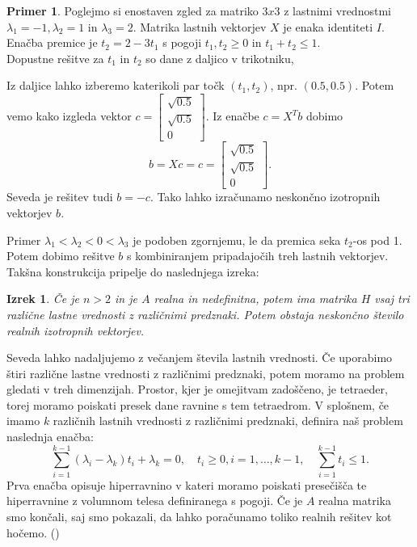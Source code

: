 \documentclass[12pt,a4paper]{amsart}
\theoremstyle{definition}
\newtheorem{primer}[definicija]{Primer}
\theoremstyle{plain}
\newtheorem{izrek}[definicija]{Izrek}
\begin{document}
\begin{primer}
Poglejmo si enostaven zgled za matriko $3x3$ z lastnimi vrednostmi $\lambda_1=-1, \lambda_2=1$ in $\lambda_3=2$.
Matrika lastnih vektorjev $X$ je enaka identiteti $I$.\\
Enačba premice je $t_2=2-3t_1$ s pogoji $t_1, t_2 \ge 0$ in $t_1+t_2\le 1$.\\
Dopustne rešitve za $t_1$ in $t_2$ so dane z daljico v trikotniku, %

Iz daljice lahko izberemo katerikoli par točk $(t_1, t_2)$, npr. $(0.5, 0.5)$. Potem vemo kako izgleda vektor 
$c=\begin{bmatrix}
\sqrt{0.5}\\
\sqrt{0.5}\\
0
\end{bmatrix}$. Iz enačbe $c=X^T b$ dobimo 
$$b=Xc=c =\begin{bmatrix}
\sqrt{0.5}\\
\sqrt{0.5}\\
0
\end{bmatrix}.$$
Seveda je rešitev tudi $b=-c$. Tako lahko izračunamo neskončno izotropnih vektorjev $b$.
\end{primer}
Primer $\lambda_1 <\lambda_2<0<\lambda_3$ je podoben zgornjemu, le da premica seka $t_2$-os pod 1. Potem dobimo rešitve $b$ s kombiniranjem pripadajočih treh lastnih vektorjev. %
Takšna konstrukcija pripelje do naslednjega izreka:
\begin{izrek}
Če je $n>2$ in je $A$ realna in nedefinitna, potem ima matrika $H$ vsaj tri različne lastne vrednosti z različnimi predznaki. Potem obstaja neskončno število realnih izotropnih vektorjev.
\end{izrek}
Seveda lahko nadaljujemo z večanjem števila lastnih vrednosti. Če uporabimo štiri različne lastne vrednosti z različnimi predznaki, potem moramo na problem gledati v treh dimenzijah. Prostor, kjer je omejitvam zadoščeno, je tetraeder, torej moramo poiskati presek dane ravnine s tem tetraedrom. 
V splošnem, če imamo $k$ različnih lastnih vrednosti z različnimi predznaki, definira naš problem naslednja enačba:
\begin{equation}
\sum_{i=1}^{k-1} (\lambda_i -\lambda_k)t_i +\lambda_k =0, \quad t_i\ge0, i=1, \dots,k-1, \quad \sum_{i=1}^{k-1}t_i \le1.
\end{equation}
Prva enačba opisuje hiperravnino v kateri moramo poiskati  presečišča te hiperravnine z volumnom telesa definiranega s pogoji.
Če je $A$ realna matrika smo končali, saj smo pokazali, da lahko poračunamo toliko realnih rešitev kot hočemo. (\cite{meurant})
\end{document}
